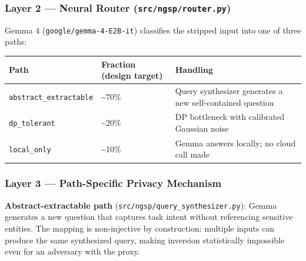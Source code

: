 \subsubsection{\texorpdfstring{Layer 2 --- Neural Router
(\texttt{src/ngsp/router.py})}{Layer 2 --- Neural Router (src/ngsp/router.py)}}\label{layer-2-neural-router-srcngsprouter.py}

Gemma 4 (\texttt{google/gemma-4-E2B-it}) classifies the stripped input
into one of three paths:

{\def\LTcaptype{none} %
\begin{longtable}[]{@{}
  >{\raggedright\arraybackslash}p{}
  >{\raggedright\arraybackslash}p{}
  >{\raggedright\arraybackslash}p{}@{}}
\toprule\noalign{}
\begin{minipage}[b]{\linewidth}\raggedright
Path
\end{minipage} & \begin{minipage}[b]{\linewidth}\raggedright
Fraction (design target)
\end{minipage} & \begin{minipage}[b]{\linewidth}\raggedright
Handling
\end{minipage} \\
\midrule\noalign{}
\endhead
\bottomrule\noalign{}
\endlastfoot
\texttt{abstract\_extractable} & \textasciitilde70\% & Query synthesizer
generates a new self-contained question \\
\texttt{dp\_tolerant} & \textasciitilde20\% & DP bottleneck with
calibrated Gaussian noise \\
\texttt{local\_only} & \textasciitilde10\% & Gemma answers locally; no
cloud call made \\
\end{longtable}
}

\subsubsection{Layer 3 --- Path-Specific Privacy
Mechanism}\label{layer-3-path-specific-privacy-mechanism}

\textbf{Abstract-extractable path}
(\texttt{src/ngsp/query\_synthesizer.py}): Gemma generates a new
question that captures task intent without referencing sensitive
entities. The mapping is non-injective by construction: multiple inputs
can produce the same synthesized query, making inversion statistically
impossible even for an adversary with the proxy.

